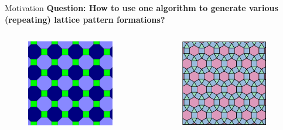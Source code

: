 \begin{frame}{Motivation}{}
  \textbf{Question: How to use one algorithm to generate
      various (repeating) lattice pattern formations?}
  \begin{columns}
    \begin{column}{.45\textwidth}
      \begin{figure}
        \centering
        \includegraphics[height=1.5in]{figs/tessellation2}
      \end{figure}
    \end{column}
    \begin{column}{.45\textwidth}
      \begin{figure}
         \centering
         \includegraphics[height=1.5in]{figs/tessellation1}
       \end{figure}
    \end{column}
  \end{columns} 
\end{frame}
